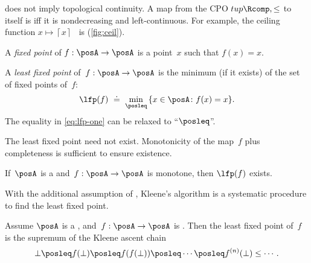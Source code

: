 \begin{remark}
    \scottcontinuity does not imply topological continuity. A map from
    the CPO $tup{\Rcomp,\leq}$ to itself is \scottcontinuous
    iff it is nondecreasing and left-continuous. For example, the ceiling
    function $x\mapsto\left\lceil x\right\rceil $~ is \scottcontinuous
    (\cref{fig:ceil}).
\end{remark}

\emph{}

A \emph{fixed point} of $f:\posA\to\posA$ is a point~$x$
such that $f(x)=x$.
\begin{definition}
    A \emph{least fixed point} of~$f:\posA\to\posA$ is the minimum
    (if it exists) of the set of fixed points of~$f$:
    \begin{equation}
        \lfp(f)\,\,\doteq\,\,\min_{\posleq}\,\{x\in\posA\colon f(x)=x\}.\label{eq:lfp-one}
    \end{equation}
    The equality in \cref{eq:lfp-one} can be relaxed to ``$\posleq$''.
\end{definition}
The least fixed point need not exist. Monotonicity of the map~$f$
plus completeness is sufficient to ensure existence.
\begin{lemma}
    \label{lem:CPO-fix-point-2}If~$\posA$ is a \CPO and~$f:\posA\rightarrow\posA$
    is monotone, then $\lfp(f)$ exists.
\end{lemma}


With the additional assumption of \scottcontinuity, Kleene's algorithm
is a systematic procedure to find the least fixed point.
\begin{lemma}
    \label{lem:kleene-1}Assume $\posA$ is a \CPO, and~$f:\posA\rightarrow\posA$
    is \scottcontinuous. Then the least fixed point of~$f$ is the supremum
    of the Kleene ascent chain
    \[
        \bot\posleq f(\bot)\posleq f(f(\bot))\posleq\cdots\posleq f^{(n)}(\bot)\leq\cdots.
    \]
\end{lemma}
